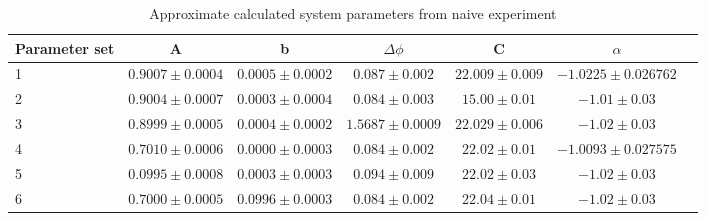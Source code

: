 \begin{table}[h]
\tiny
\begin{center}
\begin{tabular}{l*{5}{c}r}
Parameter set & A&b& $\Delta\phi$ & C & $\alpha$ \\
\hline

1 &$0.9007 \pm 0.0004$&$	 0.0005 \pm 0.0002$&  $0.087 \pm 0.002$ & $22.009 \pm 0.009$	& $-1.0225 \pm 0.026762$	\\

2& $0.9004 \pm 0.0007$ &	 $0.0003 \pm 0.0004$	&$0.084 \pm 0.003$	& $15.00 \pm 0.01$ & $-1.01 \pm 0.03$	\\

3&$0.8999 \pm 0.0005$ &	 $0.0004 \pm 0.0002$	& $1.5687 \pm 0.0009$& $22.029 \pm 0.006$ & $-1.02 \pm 0.03$	\\

4&$0.7010 \pm 0.0006$ &	 $0.0000 \pm 0.0003$	 &$0.084 \pm 0.002$	& $22.02 \pm 0.01	$ & $-1.0093 \pm 0.027575$	\\

5&$0.0995 \pm 0.0008$ &	$0.0003 \pm 0.0003$ &	 $0.094 \pm 0.009$	& $22.02 \pm 0.03$	 &$-1.02 \pm 0.03$	\\

6&$0.7000 \pm 0.0005$ &	 $0.0996 \pm 0.0003$	 &$0.084 \pm 0.002$	& $22.04 \pm 0.01$ &	 $-1.02 \pm 0.03$	\\

\end{tabular}
\caption{Approximate calculated system parameters from naive experiment}
\label{tab:naiveparams}
\end{center}
\end{table}

